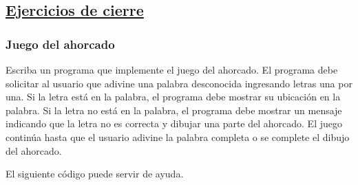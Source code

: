 \subsection*{\underline{Ejercicios de cierre}}
\subsubsection{Juego del ahorcado}
Escriba un programa que implemente el juego del ahorcado.
El programa debe solicitar al usuario que adivine una palabra desconocida ingresando letras una por una.
Si la letra está en la palabra, el programa debe mostrar su ubicación en la palabra.
Si la letra no está en la palabra, el programa debe mostrar un mensaje indicando que la letra no es correcta y dibujar una parte del ahorcado.
El juego continúa hasta que el usuario adivine la palabra completa o se complete el dibujo del ahorcado.

El siguiente código puede servir de ayuda.

\lstset{inputencoding=utf8/latin1}


